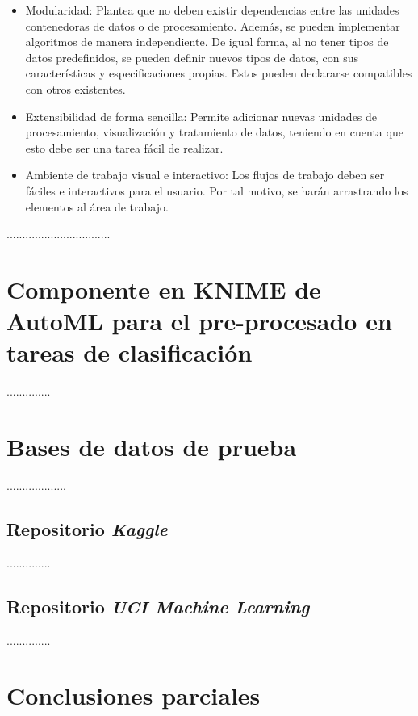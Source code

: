 \begin{itemize}
	\item Modularidad: Plantea que no deben existir dependencias entre las unidades contenedoras de datos o de procesamiento. Además, se pueden implementar algoritmos de manera independiente. De igual forma, al no tener tipos de datos predefinidos, se pueden definir nuevos tipos de datos, con sus características y especificaciones propias. Estos pueden declararse compatibles con otros existentes.
	\item	Extensibilidad de forma sencilla: Permite adicionar nuevas unidades de procesamiento, visualización y tratamiento de datos, teniendo en cuenta que esto debe ser una tarea fácil de realizar.
	\item	Ambiente de trabajo visual e interactivo: Los flujos de trabajo deben ser fáciles e interactivos para el usuario. Por tal motivo, se harán arrastrando los elementos al área de trabajo.
\end{itemize}

.................................

\section{Componente en KNIME de AutoML para el pre-procesado en tareas de clasificación}

..............


\section{Bases de datos de prueba}
...................

\subsection{Repositorio \textit{Kaggle}}
..............

\subsection{Repositorio \textit{UCI Machine Learning}}
..............

\section{Conclusiones parciales}


